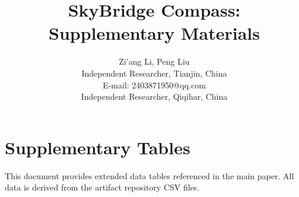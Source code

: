 \documentclass[10pt,journal,compsoc]{IEEEtran}
\begin{document}
\title{SkyBridge Compass: Supplementary Materials}
\author{Zi'ang Li, Peng Liu\\Independent Researcher, Tianjin, China\\E-mail: 2403871950@qq.com\\Independent Researcher, Qiqihar, China}
\maketitle

\section*{Supplementary Tables}

This document provides extended data tables referenced in the main paper. All data is derived from the artifact repository CSV files.
\end{document}
